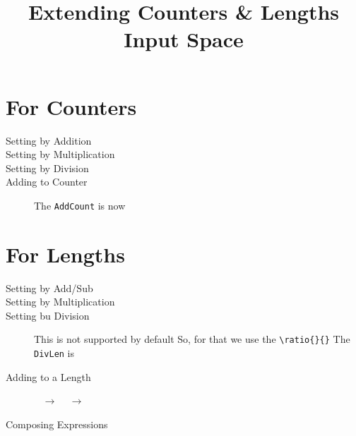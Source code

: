 \documentclass{article}
\title{\bf Extending Counters \& Lengths Input Space}
\date{}
\begin{document}
	\maketitle
	
	\section{For Counters}
	\begin{description}
		\item[Setting by Addition]
			\setcounter{AddCount}{4+2}
			\theAddCount
		\item[Setting by Multiplication]
			\setcounter{MultCount}{2*3}
			\theMultCount
		\item[Setting by Division]
			\setcounter{DivCount}{10/2}
			\theDivCount
		\item[Adding to Counter] %
			The \texttt{AddCount} is now \theAddCount
	\end{description}
	
	\section{For Lengths}
	\begin{description}
		\item[Setting by Add/Sub] 
			\newlength{\AddLen}
			\setlength{\AddLen}{20pt-10pt}
			\the\AddLen
		\item[Setting by Multiplication]
			\newlength{\MultLen}
			\setlength{\MultLen}{5pt * 3} 
			\the\MultLen
		\item[Setting bu Division]
			This is not supported by default
			So, for that we use the \verb|\ratio{}{}|
			\newlength{\DivLen} 
			\setlength{\DivLen}{1pt*\ratio{20pt}{10pt}}
			The \texttt{DivLen} is \the\DivLen
		\item[Adding to a Length]
			\addtolength{\AddLen}{2pt+3pt} \the\AddLen
			~ $\rightarrow$
			\addtolength{\AddLen}{2pt*3} \the\AddLen 
			\addtolength{\AddLen}{1pt*\ratio{8pt}{2pt}}
			~ $\rightarrow$ \the\AddLen
		\item[Composing Expressions]	
			\addtolength{\AddLen}{2pt*1+3pt} 
			\the\AddLen
	\end{description}
	
\end{document}
